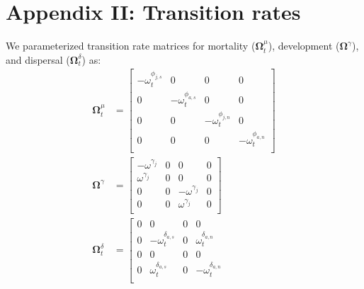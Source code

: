 \documentclass[11pt]{article}
\begin{document}
{%


\section*{Appendix II: Transition rates} 

We parameterized transition rate matrices for mortality ($\boldsymbol\Omega^{\mu}_t$), 
development ($\boldsymbol\Omega^{\gamma}$), 
and dispersal ($\boldsymbol\Omega^{\delta}_t$) as:
\begin{equation} \label{eq:Theta}
\begin{aligned}
\boldsymbol\Omega^{\mu}_t & = 
\left[
\begin{array}{cc|cc}
    -\omega^{\phi_{j,s}}_t & 0 & 0 & 0 \\
    0 & -\omega^{\phi_{a,s}}_t & 0 & 0 \\
    \hline
    0 & 0 & -\omega^{\phi_{j,n}}_t & 0 \\
    0 & 0 & 0 & -\omega^{\phi_{a,n}}_t \\
    \end{array}
\right] \\
\boldsymbol\Omega^{\gamma} & = 
\left[
\begin{array}{cc|cc}
    -\omega^{\gamma_{j}} & 0 & 0 & 0 \\
    \omega^{\gamma_{j}}  & 0 & 0 & 0 \\
    \hline
    0 & 0 & -\omega^{\gamma_{j}} & 0 \\
    0 & 0 & \omega^{\gamma_{j}}  & 0 \\
    \end{array}
\right] \\
\boldsymbol\Omega^{\delta}_t & = 
\left[
\begin{array}{cc|cc}
    0 & 0 & 0 & 0 \\
    0 & -\omega^{\delta_{a,s}}_t & 0 & \omega^{\delta_{a,n}}_t \\
    \hline
    0 & 0 & 0 & 0 \\
    0 & \omega^{\delta_{a,s}}_t & 0 & -\omega^{\delta_{a,n}}_t \\

\end{array}
\end{aligned}
\end{equation}}
\end{document}
